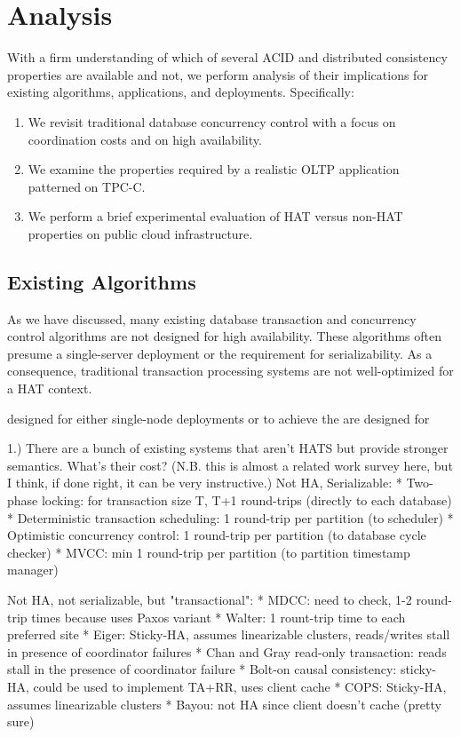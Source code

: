 
\section{Analysis}
\label{sec:evaluation}

With a firm understanding of which of several ACID and distributed
consistency properties are available and not, we perform analysis of
their implications for existing algorithms, applications, and
deployments. Specifically:

\begin{enumerate}
\item We revisit traditional database concurrency control with a focus
  on coordination costs and on high availability.
\item We examine the properties required by a realistic OLTP
  application patterned on TPC-C.
\item We perform a brief experimental evaluation of HAT versus non-HAT
  properties on public cloud infrastructure.
\end{enumerate}

\subsection{Existing Algorithms}

As we have discussed, many existing database transaction and
concurrency control algorithms are not designed for high
availability. These algorithms often presume a single-server
deployment or the requirement for serializability. As a consequence,
traditional transaction processing systems are not well-optimized for
a HAT context.

 designed for either single-node deployments or
to achieve the are designed for

1.) There are a bunch of existing systems that aren't HATS but provide stronger semantics. What's their cost? (N.B. this is almost a related work survey here, but I think, if done right, it can be very instructive.)
Not HA, Serializable:
* Two-phase locking: for transaction size T, T+1 round-trips (directly to each database)
* Deterministic transaction scheduling: 1 round-trip per partition (to scheduler)
* Optimistic concurrency control: 1 round-trip per partition (to database cycle checker)
* MVCC: min 1 round-trip per partition (to partition timestamp manager)

Not HA, not serializable, but "transactional":
* MDCC: need to check, 1-2 round-trip times because uses Paxos variant
* Walter: 1 rount-trip time to each preferred site
* Eiger: Sticky-HA, assumes linearizable clusters, reads/writes stall in presence of coordinator failures
* Chan and Gray read-only transaction: reads stall in the presence of coordinator failure
* Bolt-on causal consistency: sticky-HA, could be used to implement TA+RR, uses client cache
* COPS: Sticky-HA, assumes linearizable clusters
* Bayou: not HA since client doesn't cache (pretty sure)

